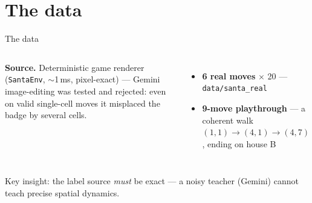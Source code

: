 \documentclass[aspectratio=169,11pt]{beamer}
\newcommand{\code}[1]{\texttt{\small #1}}
\begin{document}
\section{The data}
\begin{frame}{The data}
  \begin{columns}[T]
      \textbf{Source.} Deterministic game renderer (\code{SantaEnv}, $\sim$1\,ms,
      pixel-exact) --- Gemini image-editing was \alert{tested and rejected}:
      even on valid single-cell moves it misplaced the badge by several cells.
      \vspace{0.5em}
      \begin{itemize}
        \item \textbf{6 real moves} $\times$ 20 --- \code{data/santa\_real}
        \item \textbf{9-move playthrough} --- a coherent walk
              $(1,1)\!\to\!(4,1)\!\to\!(4,7)$, ending on house B
      \end{itemize}
      \centering\small
  \end{columns}
  \vspace{0.4em}
  \footnotesize\alert{Key insight:} the label source \emph{must} be exact ---
  a noisy teacher (Gemini) cannot teach precise spatial dynamics.
\end{frame}

\end{document}
